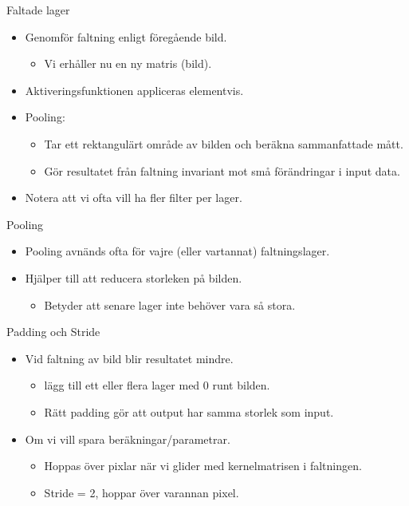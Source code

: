 \documentclass[10pt,english]{beamer}
\begin{document}
\begin{frame}{Faltade lager}
    \begin{itemize}
        \item Genomför faltning enligt föregående bild.
        \begin{itemize}
            \item Vi erhåller nu en ny matris (bild).
        \end{itemize}
        \item Aktiveringsfunktionen appliceras elementvis.
        \item Pooling:
        \begin{itemize}
            \item Tar ett rektangulärt område av bilden och beräkna sammanfattade mått.
            \item Gör resultatet från faltning invariant mot små förändringar i input data.
        \end{itemize}
        \item Notera att vi ofta vill ha fler filter per lager.
    \end{itemize}
\end{frame}

\begin{frame}{Pooling}
    
    \begin{itemize}
        \item Pooling avnänds ofta för vajre (eller vartannat) faltningslager.
        \item Hjälper till att reducera storleken på bilden.
        \begin{itemize}
            \item Betyder att senare lager inte behöver vara så stora.
        \end{itemize}
    \end{itemize}

\end{frame}

\begin{frame}{Padding och Stride}
    
    \begin{itemize}
        \item Vid faltning av bild blir resultatet mindre.
        \begin{itemize}
            \item {} lägg till ett eller flera lager med 0 runt bilden.
            \item Rätt padding gör att output har samma storlek som input.
        \end{itemize}
        \item Om vi vill spara beräkningar/parametrar.
        \begin{itemize}
            \item {} Hoppas över pixlar när vi glider med kernelmatrisen i faltningen.
            \item Stride = 2, hoppar över varannan pixel.
        \end{itemize}
    \end{itemize}

\end{frame}
\end{document}
